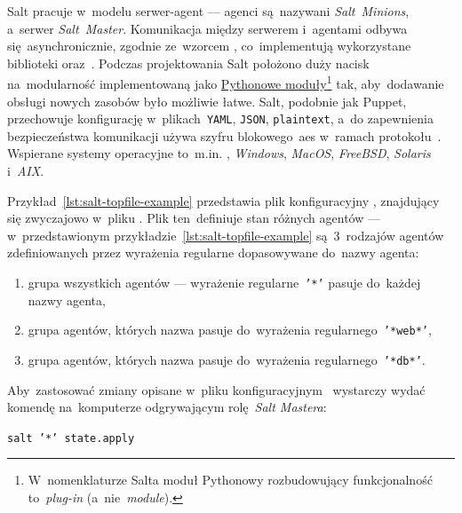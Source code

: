 \documentclass[thesis]{subfiles}
\begin{document}
Salt pracuje w~modelu serwer-agent --- agenci są~nazywani \emph{Salt~Minions}, a~serwer \emph{Salt~Master}. Komunikacja między serwerem i~agentami odbywa się~asynchronicznie, zgodnie ze~wzorcem , co~implementują wykorzystane biblioteki  oraz~. Podczas projektowania Salt położono duży nacisk na~modularność implementowaną jako \href{https://docs.python.org/3.7/tutorial/modules.html}{Pythonowe moduły}\footnote{W~nomenklaturze Salta moduł Pythonowy rozbudowujący funkcjonalność to~\emph{plug-in} (a~nie~\emph{module}).} tak, aby~dodawanie obsługi nowych zasobów było możliwie łatwe. Salt, podobnie jak Puppet, przechowuje konfigurację w~plikach~\texttt{YAML}, \texttt{JSON}, \texttt{plaintext}, a~do zapewnienia bezpieczeństwa komunikacji używa szyfru blokowego~\gls{aes} w~ramach protokołu~. Wspierane systemy operacyjne to~m.in. \emph{}, \emph{Windows}, \emph{MacOS}, \emph{FreeBSD}, \emph{Solaris} i~\emph{AIX}.

Przykład~\ref{lst:salt-topfile-example} przedstawia plik konfiguracyjny , znajdujący się zwyczajowo w~pliku . Plik ten~definiuje stan różnych agentów --- w~przedstawionym przykładzie~\ref{lst:salt-topfile-example} są~3~rodzajów agentów zdefiniowanych przez wyrażenia regularne dopasowywane do~nazwy agenta:\mynobreakpar
\begin{enumerate}
	\item grupa wszystkich agentów --- wyrażenie regularne~\texttt{'*'} pasuje do~każdej nazwy agenta,
	\item grupa agentów, których nazwa pasuje do~wyrażenia regularnego~\texttt{'*web*'},
	\item grupa agentów, których nazwa pasuje do~wyrażenia regularnego~\texttt{'*db*'}.
\end{enumerate}
Aby~zastosować zmiany opisane w~pliku konfiguracyjnym~ wystarczy wydać komendę na~komputerze odgrywającym rolę~\emph{Salt Mastera}:
\begin{center}
	\texttt{salt '*' state.apply}
\end{center}
\end{document}
